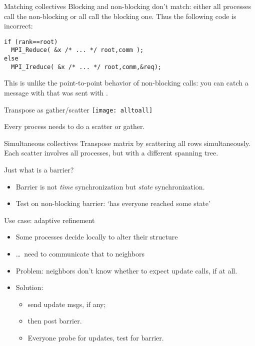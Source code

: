 \begin{numberedframe}{Matching collectives}
  \label{sl:coll-nonblock-match}
  Blocking and non-blocking don't match: either all processes
  call the non-blocking or all call the blocking one.
  Thus the following code is incorrect:
\begin{lstlisting}
if (rank==root)
  MPI_Reduce( &x /* ... */ root,comm );
else
  MPI_Ireduce( &x /* ... */ root,comm,&req);
\end{lstlisting}
  This is unlike the point-to-point behavior of non-blocking calls:
  you can catch a message with 
  that was sent with .
\end{numberedframe}

\begin{numberedframe}{Transpose as gather/scatter}
  \texttt{[image: alltoall]}

  Every process needs to do a scatter or gather.
\end{numberedframe}

\begin{numberedframe}{Simultaneous collectives}
  Transpose matrix by scattering all rows simultaneously.\\
  Each scatter involves all processes, but with a
  different spanning tree.

\end{numberedframe}


\begin{numberedframe}{Just what is a barrier?}
  \begin{itemize}
  \item Barrier is not \emph{time} synchronization but \emph{state}
    synchronization.
  \item Test on non-blocking barrier: `has everyone reached some
    state'
  \end{itemize}
\end{numberedframe}

\begin{numberedframe}{Use case: adaptive refinement}
  \begin{itemize}
  \item Some processes decide locally to alter their structure
  \item \ldots~need to communicate that to neighbors
  \item Problem: neighbors don't know whether to expect update calls,
    if at all.
  \item Solution:
    \begin{itemize}
    \item send update msgs, if any;
    \item then post barrier.
    \item Everyone probe for updates, test for barrier.    
    \end{itemize}
  \end{itemize}
\end{numberedframe}

